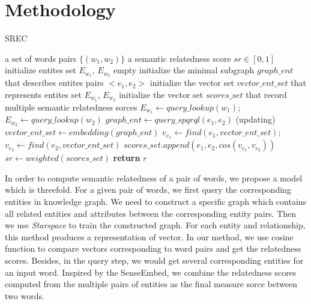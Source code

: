 \section{Methodology}
\label{methodology}

\begin{algorithm}
	\renewcommand{\algorithmicrequire}{\textbf{Input:}}
	\renewcommand{\algorithmicensure}{\textbf{Output:}}
	\caption{SREC}
	\label{alg:1}
    \begin{algorithmic}[1]
        \REQUIRE a set of words pairs $\{(w_1, w_2)\}$
        \ENSURE a semantic relatedness score $sr \in [0,1]$
        \STATE initialize entites set ${E_{w_1}}$, ${E_{w_2}}$ empty
        \STATE initialize the minimal subgraph $graph\_ent$ that describes entites pairs $<e_1,e_2>$
        \STATE initialize the vector set $vector\_ent\_set$ that represents entites set ${E_{w_1}}$, ${E_{w_2}}$
        \STATE initialize the vector set $scores\_set$ that record multiple semantic relatedness sorces 
        \STATE ${E_{w_1}} \leftarrow query\_lookup(w_1)$; ${E_{w_2}} \leftarrow query\_lookup(w_2)$
        \STATE $graph\_ent \leftarrow query\_spqrql(e_1, e_2)$ (updating)
        \STATE $vector\_ent\_set \leftarrow embedding(graph\_ent)$
        \STATE $v_{e_1} \leftarrow find(e_1, vector\_ent\_set)$; $v_{e_2} \leftarrow find(e_2, vector\_ent\_set)$
        \STATE $scores\_set.append(e_1, e_2, cos(v_{e_1}, v_{e_2}))$
        \ENDFOR
        \STATE $sr \leftarrow weighted(scores\_set)$
		\STATE \textbf{return} $r$
	\end{algorithmic}  
\end{algorithm}

In order to compute semantic relatedness of a pair of words, we propose a model which is
threefold. 
For a given pair of words, we first query the corresponding entities in knowledge graph.
We need to construct a specific graph which contains all related entities and attributes between the 
corresponding entity pairs. Then we use \emph{Starspace}\cite{corr/Ledell17} to train the constructed 
graph. For each entity and relationship, this method produces a representation of vector.
In our method, we use cosine function to compare vectors corresponding to word pairs and get the relatedness scores.
Besides, in the query step, we would get several corresponding entities for an input word. Inspired by
the SenseEmbed\cite{acl/IacobacciPN15}, we combine the relatedness scores computed from the multiple pairs of entities 
as the final measure sorce between two words.

